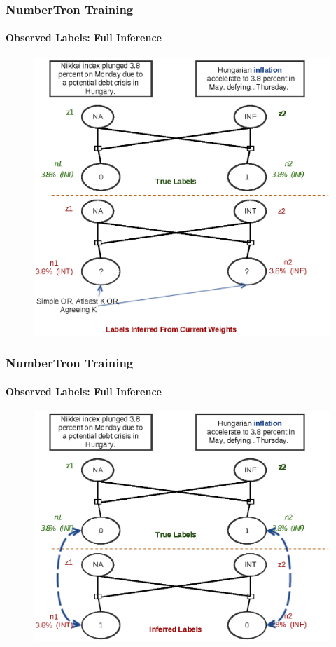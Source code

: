 \documentclass{beamer}
\begin{document}
\begin{frame}
\frametitle{NumberTron Training}
\framesubtitle{Observed Labels: Full Inference}
\begin{figure}
\includegraphics[width=\textwidth, height=0.85\textheight]{images/fullinf_2.eps}
\end{figure}
\end{frame}


\begin{frame}
\frametitle{NumberTron Training}
\framesubtitle{Observed Labels: Full Inference}
\begin{figure}
\includegraphics[width=\textwidth, height=0.85\textheight]{images/fullinf_3.eps}
\end{figure}
\end{frame}
\end{document}
